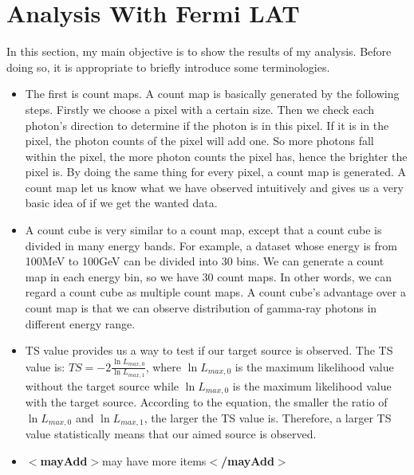 \documentclass[12pt]{report}
\newcommand{\mayAdd}[1]{
  $<$\textbf{mayAdd}$>$#1$<$\textbf{/mayAdd}$>$
}
\begin{document}
        \section{Analysis With Fermi LAT}
        In this section, my main objective is to show the results of my analysis. Before doing so, it is 
        appropriate to briefly introduce some terminologies. 
        \begin{itemize}
          \item The first is count maps. A count map is basically generated by the following steps. Firstly we choose a 
            pixel with a certain size. Then we check each photon's direction to determine if the photon is in this 
            pixel. If it is in the pixel, the photon counts of the pixel will add one. So more photons fall within 
            the pixel, the more photon counts the pixel has, hence the brighter the pixel is. By doing the same thing 
            for every pixel, a count map is generated. A count map let us know what we have observed intuitively and 
            gives us a very basic idea of if we get the wanted data. 
          \item A count cube is very similar to a count map, except that a count cube is divided in many energy
            bands. For example, a dataset whose energy is from 100MeV to 100GeV can be divided into 30 bins. We can
            generate a count map in each energy bin, so we have 30 count maps. In other words, we can regard a 
            count cube as multiple count maps. A count cube's advantage over a count map is that we can 
            observe distribution of gamma-ray photons in different energy range. 
          \item TS value provides us a way to test if our target source is observed. The TS value is: 
            $TS = -2 \frac{\ln{L_{max, 0}}}{\ln{L_{max, 1}}}$, where $\ln{L_{max, 0}}$ is the maximum likelihood value 
            without the target source while $\ln{L_{max, 0}}$ is the maximum likelihood value with the target source.
            According to the equation, the smaller the ratio of $\ln{L_{max, 0}}$ and $\ln{L_{max, 1}}$, the larger
            the TS value is. Therefore, a larger TS value statistically means that our aimed source is observed. 
          \item \mayAdd{may have more items}
        \end{itemize}
\end{document}
